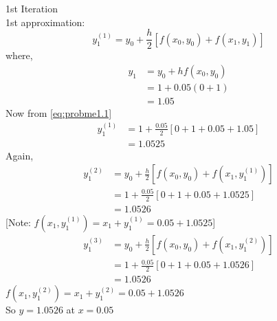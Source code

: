\documentclass[../main-sheet.tex]{subfiles}
\begin{document}
\begin{soln}
    1st Iteration\\

    1st approximation:
    \begin{equation}
        y_{1}^{(1)}=y_0+\frac{h}{2}\left[ f(x_0,y_0)+f(x_{1},y_{1})\right]
        \label{eq:probme1.1}
    \end{equation}
    where,
    \begin{align*}
        y_1&=y_0+hf(x_0,y_0)\\
        &=1+0.05(0+1)\\
        &=1.05
    \end{align*}
    Now from \eqref{eq:probme1.1}
    \begin{align*}
        y_1^{(1)}&=1+\frac{0.05}{2}\left[ 0+1+0.05+1.05\right]\\
        &=1.0525
    \end{align*}
    Again,
    \begin{align*}
        y_1^{(2)}&=y_0+\frac{h}{2}\left[ f(x_0,y_0)+f(x_{1},y_{1}^{(1)})\right]\\
        &=1+\frac{0.05}{2}\left[ 0+1+0.05+1.0525\right]\\
        &=1.0526
    \end{align*}
    [Note: \(f(x_1,y_1^{(1)})=x_1+y_1^{(1)}=0.05+1.0525\)]
    \begin{align*}
        y_1^{(3)}&=y_0+\frac{h}{2}\left[ f(x_0,y_0)+f(x_{1},y_{1}^{(2)})\right]\\
        &=1+\frac{0.05}{2}\left[ 0+1+0.05+1.0526\right]\\
        &=1.0526
    \end{align*}
    \(f(x_1,y_1^{(2)})=x_1+y_1^{(2)}=0.05+1.0526\)\\
    So \(y=1.0526\) at \(x=0.05\)\\
    

\end{soln}
\end{document}
